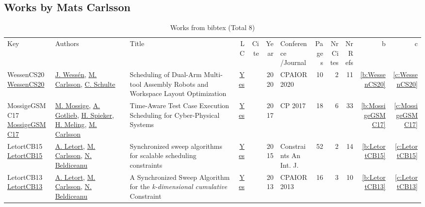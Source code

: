 \subsection{Works by Mats Carlsson}
\label{sec:a91}
{\scriptsize
\begin{longtable}{>{\raggedright\arraybackslash}p{3cm}>{\raggedright\arraybackslash}p{6cm}>{\raggedright\arraybackslash}p{6.5cm}rrrp{2.5cm}rrrrr}
\rowcolor{white}\caption{Works from bibtex (Total 8)}\\ \toprule
\rowcolor{white}Key & Authors & Title & LC & Cite & Year & \shortstack{Conference\\/Journal} & Pages & \shortstack{Nr\\Cites} & \shortstack{Nr\\Refs} & b & c \\ \midrule\endhead
\bottomrule
\endfoot
WessenCS20 \href{https://doi.org/10.1007/978-3-030-58942-4\_33}{WessenCS20} & \hyperref[auth:a90]{J. Wess{\'{e}}n}, \hyperref[auth:a91]{M. Carlsson}, \hyperref[auth:a92]{C. Schulte} & Scheduling of Dual-Arm Multi-tool Assembly Robots and Workspace Layout Optimization & \href{works/WessenCS20.pdf}{Yes} & \cite{WessenCS20} & 2020 & CPAIOR 2020 & 10 & 2 & 11 & \ref{b:WessenCS20} & \ref{c:WessenCS20}\\
MossigeGSMC17 \href{https://doi.org/10.1007/978-3-319-66158-2\_25}{MossigeGSMC17} & \hyperref[auth:a200]{M. Mossige}, \hyperref[auth:a201]{A. Gotlieb}, \hyperref[auth:a202]{H. Spieker}, \hyperref[auth:a203]{H. Meling}, \hyperref[auth:a91]{M. Carlsson} & Time-Aware Test Case Execution Scheduling for Cyber-Physical Systems & \href{works/MossigeGSMC17.pdf}{Yes} & \cite{MossigeGSMC17} & 2017 & CP 2017 & 18 & 6 & 33 & \ref{b:MossigeGSMC17} & \ref{c:MossigeGSMC17}\\
LetortCB15 \href{https://doi.org/10.1007/s10601-014-9172-8}{LetortCB15} & \hyperref[auth:a128]{A. Letort}, \hyperref[auth:a91]{M. Carlsson}, \hyperref[auth:a129]{N. Beldiceanu} & Synchronized sweep algorithms for scalable scheduling constraints & \href{works/LetortCB15.pdf}{Yes} & \cite{LetortCB15} & 2015 & Constraints An Int. J. & 52 & 2 & 14 & \ref{b:LetortCB15} & \ref{c:LetortCB15}\\
LetortCB13 \href{https://doi.org/10.1007/978-3-642-38171-3\_10}{LetortCB13} & \hyperref[auth:a128]{A. Letort}, \hyperref[auth:a91]{M. Carlsson}, \hyperref[auth:a129]{N. Beldiceanu} & A Synchronized Sweep Algorithm for the \emph{k-dimensional cumulative} Constraint & \href{works/LetortCB13.pdf}{Yes} & \cite{LetortCB13} & 2013 & CPAIOR 2013 & 16 & 3 & 10 & \ref{b:LetortCB13} & \ref{c:LetortCB13}\\

\end{longtable}}
